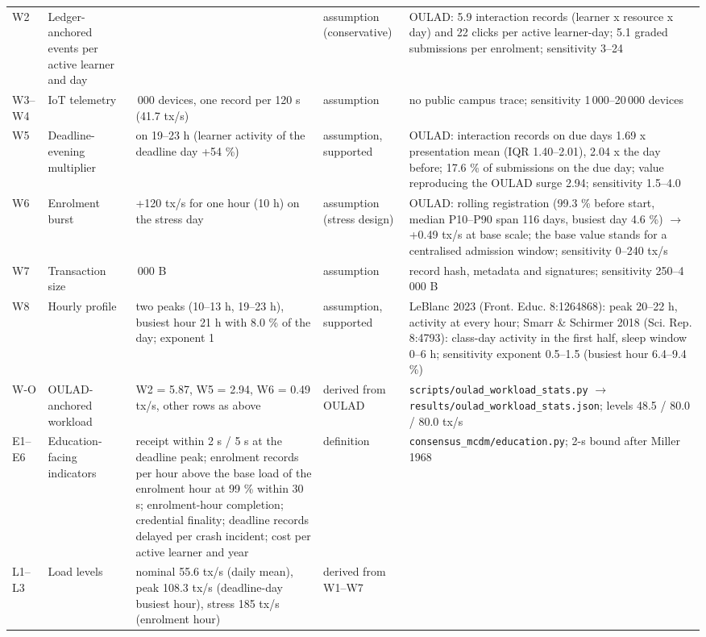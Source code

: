 \documentclass[a4paper,10pt]{article}
\begin{document}
\begin{longtable}{>{\raggedright\arraybackslash}p{0.9cm} >{\raggedright\arraybackslash}p{3.2cm} >{\raggedright\arraybackslash}p{8.6cm} >{\raggedright\arraybackslash}p{2.6cm} >{\raggedright\arraybackslash}p{7.2cm}}
W2 & Ledger-anchored events per active learner and day & 12 & assumption (conservative) & OULAD: 5.9 interaction records (learner x resource x day) and 22 clicks per active learner-day; 5.1 graded submissions per enrolment; sensitivity 3--24\\
W3--W4 & IoT telemetry & 5\,000 devices, one record per 120 s (41.7 tx/s) & assumption & no public campus trace; sensitivity 1\,000--20\,000 devices\\
W5 & Deadline-evening multiplier & 2.5 on 19--23 h (learner activity of the deadline day +54 \%) & assumption, supported & OULAD: interaction records on due days 1.69 x presentation mean (IQR 1.40--2.01), 2.04 x the day before; 17.6 \% of submissions on the due day; value reproducing the OULAD surge 2.94; sensitivity 1.5--4.0\\
W6 & Enrolment burst & +120 tx/s for one hour (10 h) on the stress day & assumption (stress design) & OULAD: rolling registration (99.3 \% before start, median P10--P90 span 116 days, busiest day 4.6 \%) $\rightarrow$ +0.49 tx/s at base scale; the base value stands for a centralised admission window; sensitivity 0--240 tx/s\\
W7 & Transaction size & 1\,000 B & assumption & record hash, metadata and signatures; sensitivity 250--4\,000 B\\
W8 & Hourly profile & two peaks (10--13 h, 19--23 h), busiest hour 21 h with 8.0 \% of the day; exponent 1 & assumption, supported & LeBlanc 2023 (Front. Educ. 8:1264868): peak 20--22 h, activity at every hour; Smarr \& Schirmer 2018 (Sci. Rep. 8:4793): class-day activity in the first half, sleep window 0--6 h; sensitivity exponent 0.5--1.5 (busiest hour 6.4--9.4 \%)\\
W-O & OULAD-anchored workload & W2 = 5.87, W5 = 2.94, W6 = 0.49 tx/s, other rows as above & derived from OULAD & \texttt{scripts/oulad\_workload\_stats.py} $\rightarrow$ \texttt{results/oulad\_workload\_stats.json}; levels 48.5 / 80.0 / 80.0 tx/s\\
E1--E6 & Education-facing indicators & receipt within 2 s / 5 s at the deadline peak; enrolment records per hour above the base load of the enrolment hour at 99 \% within 30 s; enrolment-hour completion; credential finality; deadline records delayed per crash incident; cost per active learner and year & definition & \texttt{consensus\_mcdm/education.py}; 2-s bound after Miller 1968\\
L1--L3 & Load levels & nominal 55.6 tx/s (daily mean), peak 108.3 tx/s (deadline-day busiest hour), stress 185 tx/s (enrolment hour) & derived from W1--W7 & \\

\end{longtable}
\end{document}
